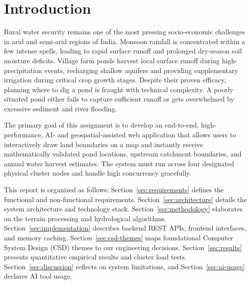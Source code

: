 \documentclass[manuscript,screen,review]{acmart}
\begin{document}

\maketitle

\section{Introduction}
\label{sec:intro}
Rural water security remains one of the most pressing socio-economic challenges in arid and semi-arid regions of India. Monsoon rainfall is concentrated within a few intense spells, leading to rapid surface runoff and prolonged dry-season soil moisture deficits. Village farm ponds harvest local surface runoff during high-precipitation events, recharging shallow aquifers and providing supplementary irrigation during critical crop growth stages. Despite their proven efficacy, planning where to dig a pond is fraught with technical complexity. A poorly situated pond either fails to capture sufficient runoff or gets overwhelmed by excessive sediment and river flooding. 

The primary goal of this assignment is to develop an end-to-end, high-performance, AI- and geospatial-assisted web application that allows users to interactively draw land boundaries on a map and instantly receive mathematically validated pond locations, upstream catchment boundaries, and annual water harvest estimates. The system must run across four designated physical cluster nodes and handle high concurrency gracefully. 

This report is organized as follows: Section~\ref{sec:requirements} defines the functional and non-functional requirements. Section~\ref{sec:architecture} details the system architecture and technology stack. Section~\ref{sec:methodology} elaborates on the terrain processing and hydrological algorithms. Section~\ref{sec:implementation} describes backend REST APIs, frontend interfaces, and memory caching. Section~\ref{sec:csd-themes} maps foundational Computer System Design (CSD) themes to our engineering decisions. Section~\ref{sec:results} presents quantitative empirical results and cluster load tests. Section~\ref{sec:discussion} reflects on system limitations, and Section~\ref{sec:ai-usage} declares AI tool usage.
\end{document}
